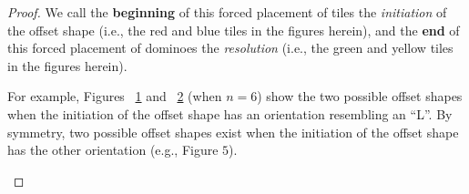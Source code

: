 \documentclass{article}
\begin{document}
\begin{proof}
    We call the \textbf{beginning} of this forced placement of tiles the \textit{initiation} of the offset shape (i.e., the red and blue tiles in the figures herein), and the \textbf{end} of this forced placement of dominoes the \textit{resolution} (i.e., the green and yellow tiles in the figures herein).
    
    For example, Figures ~\ref{figure6} and ~\ref{figure7}  (when $n = 6$) show the two possible offset shapes when the initiation of the offset shape has an orientation resembling an ``L''. By symmetry, two possible offset shapes exist when the initiation of the offset shape has the other orientation (e.g., Figure $5$).
    
    \begin{figure}[H]
        \centering
        \captionsetup{labelsep=none} %
        \setlength{\tabcolsep}{1pt}
        \renewcommand{\arraystretch}{0.8}
    \caption{}
    \label{figure6}
    \end{figure}
    
    \begin{figure}[H]
        \centering
        \captionsetup{labelsep=none} %
        \setlength{\tabcolsep}{1pt}
        \renewcommand{\arraystretch}{0.8}
    \caption{}
    \label{figure7}
    \end{figure}
    

\end{proof}
\end{document}

